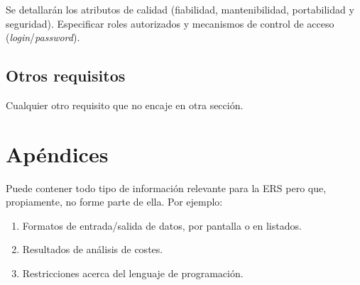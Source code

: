 \documentclass[12pt,a4paper]{article}
\begin{document}
Se detallarán los atributos de calidad (fiabilidad, mantenibilidad, portabilidad y seguridad). Especificar roles autorizados y mecanismos de control de acceso (\emph{login}/\emph{password}).

\subsection{Otros requisitos}
\label{sec:otros_requisitos}

Cualquier otro requisito que no encaje en otra sección.

\newpage


\section{Apéndices}
\label{sec:apendices}

Puede contener todo tipo de información relevante para la ERS pero que, propiamente, no forme parte de ella. Por ejemplo:
\begin{enumerate}
    \item Formatos de entrada/salida de datos, por pantalla o en listados.
    \item Resultados de análisis de costes.
    \item Restricciones acerca del lenguaje de programación.
\end{enumerate}
\end{document}
